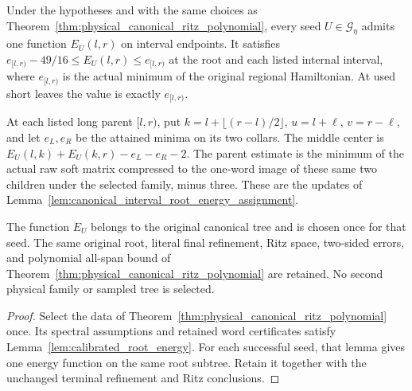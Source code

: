 \begin{corollary}
    \label{cor:canonical_ritz_energy}
    \leanok
    Under the hypotheses and with the same choices as
    Theorem~\ref{thm:physical_canonical_ritz_polynomial}, every seed
    $U\in\mathcal G_\eta$ admits one function $E_U(l,r)$ on interval
    endpoints. It satisfies
    $e_{[l,r)}-49/16\le E_U(l,r)\le e_{[l,r)}$ at the root and
    each listed internal interval, where $e_{[l,r)}$ is the actual
    minimum of the original regional Hamiltonian. At used short leaves
    the value is exactly $e_{[l,r)}$.

    At each listed long parent $[l,r)$, put $k=l+\lfloor(r-l)/2\rfloor$,
    $u=l+\ell$, $v=r-\ell$, and let $e_L,e_R$ be the attained
    minima on its two collars. The middle center is
    $E_U(l,k)+E_U(k,r)-e_L-e_R-2$. The parent estimate is the minimum
    of the actual raw soft matrix compressed to the one-word image of
    these same two children under the selected family, minus three.
    These are the updates of Lemma~\ref{lem:canonical_interval_root_energy_assignment}.

    The function $E_U$ belongs to the original canonical tree and is
    chosen once for that seed. The same original root, literal final
    refinement, Ritz space, two-sided errors, and polynomial all-span
    bound of Theorem~\ref{thm:physical_canonical_ritz_polynomial} are
    retained. No second physical family or sampled tree is selected.
\end{corollary}
\begin{proof}\leanok
    Select the data of
    Theorem~\ref{thm:physical_canonical_ritz_polynomial} once.
    Its spectral assumptions and retained word certificates satisfy
    Lemma~\ref{lem:calibrated_root_energy}. For each successful seed,
    that lemma gives one energy function on the same root subtree.
    Retain it together with the unchanged terminal refinement and
    Ritz conclusions.
\end{proof}
